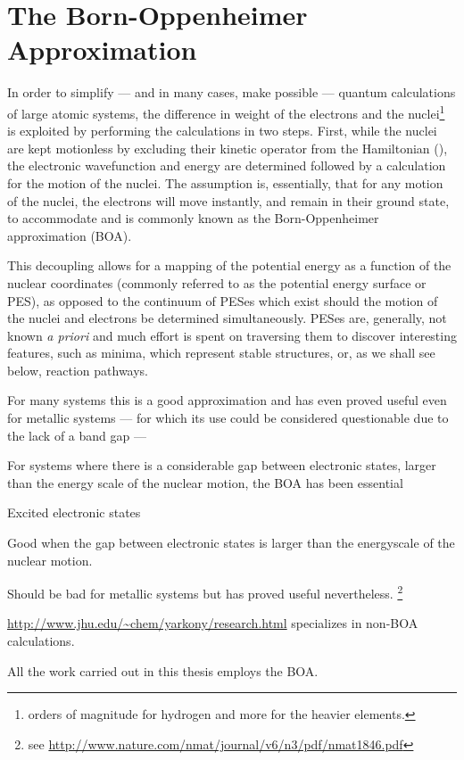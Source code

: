 \section{The Born-Oppenheimer Approximation}
\label{sec:born-oppenheimer}

In order to simplify --- and in many cases, make possible --- quantum calculations of large atomic systems, the difference in weight of the electrons and the nuclei\footnote{ orders of magnitude for hydrogen and more for the heavier elements.} is exploited by performing the calculations in two steps.
First, while the nuclei are kept motionless by excluding their kinetic operator from the Hamiltonian (), the electronic wavefunction and energy are determined followed by a calculation for the motion of the nuclei.
The assumption is, essentially, that for any motion of the nuclei, the electrons will move instantly, and remain in their ground state, to accommodate and is commonly known as the Born-Oppenheimer approximation\cite{born-oppenheimer-1927} (BOA).


This decoupling allows for a mapping of the potential energy as a function of the nuclear coordinates (commonly referred to as the potential energy surface or PES), as opposed to the continuum of PESes which exist should the motion of the nuclei and electrons be determined simultaneously.
PESes are, generally, not known \textit{a priori} and much effort is spent on traversing them to discover interesting features, such as minima, which represent stable structures, or, as we shall see below, reaction pathways.


\bit
\item For many systems this is a good approximation and has even proved useful even for metallic systems --- for which its use could be considered questionable due to the lack of a band gap ---
\item For systems where there is a considerable gap between electronic states, larger than the energy scale of the nuclear motion, the BOA has been essential 
\item Excited electronic states
\item Good when the gap between electronic states is larger than the energyscale of the nuclear motion.
\item Should be bad for metallic systems but has proved useful nevertheless. \footnote{see \url{http://www.nature.com/nmat/journal/v6/n3/pdf/nmat1846.pdf}}
\item \url{http://www.jhu.edu/~chem/yarkony/research.html} specializes in non-BOA calculations.
\eit

All the work carried out in this thesis employs the BOA.

